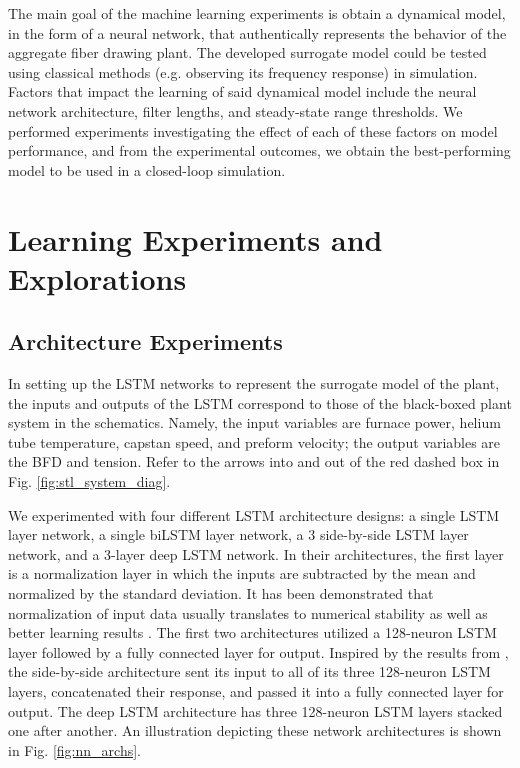 The main goal of the machine learning experiments is obtain a dynamical model, in the form of a neural network, that authentically represents the behavior of the aggregate fiber drawing plant. The developed surrogate model could be tested using classical methods (e.g. observing its frequency response) in simulation. Factors that impact the learning of said dynamical model include the neural network architecture, filter lengths, and steady-state range thresholds. We performed experiments investigating the effect of each of these factors on model performance, and from the experimental outcomes, we obtain the best-performing model to be used in a closed-loop simulation. 

\section{Learning Experiments and Explorations} \label{ch:exp:exp}

\subsection{Architecture Experiments} \label{ch:exp:arch}

In setting up the LSTM networks to represent the surrogate model of the plant, the inputs and outputs of the LSTM correspond to those of the black-boxed plant system in the schematics. Namely, the input variables are furnace power, helium tube temperature, capstan speed, and preform velocity; the output variables are the BFD and tension. Refer to the arrows into and out of the red dashed box in Fig. \ref{fig:stl_system_diag}.

We experimented with four different LSTM architecture designs: a single LSTM layer network, a single biLSTM layer network, a 3 side-by-side LSTM layer network, and a 3-layer deep LSTM network. In their architectures, the first layer is a normalization layer in which the inputs are subtracted by the mean and normalized by the standard deviation. It has been demonstrated that normalization of input data usually translates to numerical stability as well as better learning results \cite{normalization1, normalization2}. The first two architectures utilized a 128-neuron LSTM layer followed by a fully connected layer for output. Inspired by the results from \cite{gonzalez}, the side-by-side architecture sent its input to all of its three 128-neuron LSTM layers, concatenated their response, and passed it into a fully connected layer for output. The deep LSTM architecture has three 128-neuron LSTM layers stacked one after another. An illustration depicting these network architectures is shown in Fig. \ref{fig:nn_archs}. 

